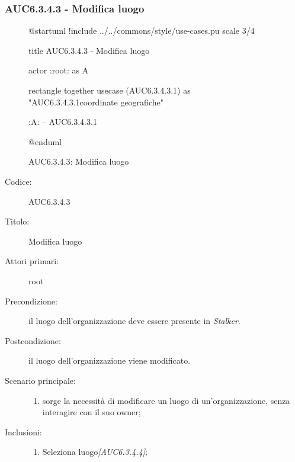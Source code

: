 \documentclass[casi-duso]{subfiles}
\begin{document}
\subsubsection{AUC6.3.4.3 - Modifica luogo}%
\label{subsub:AUC6.3.4.3}

\begin{figure}[h!] 
  \centering 
  \begin{plantuml}
  @startuml 
  !include ../../commons/style/use-cases.pu
  scale 3/4

  title AUC6.3.4.3 - Modifica luogo

  actor :root: as A

  rectangle {
    together {
      usecase (AUC6.3.4.3.1) as "AUC6.3.4.3.1\nModifica coordinate geografiche"
    }
  }

  :A: -- AUC6.3.4.3.1

  @enduml
  \end{plantuml} 
  \caption{AUC6.3.4.3: Modifica luogo} 
  \label{fig:auc6_3_4_3} 
\end{figure}

\begin{description}
  \item[Codice:] AUC6.3.4.3
  \item[Titolo:] Modifica luogo
  \item[Attori primari:] root
  \item[Precondizione:] il luogo dell'organizzazione deve essere presente in \emph{Stalker}.
  \item[Postcondizione:] il luogo dell'organizzazione viene modificato.
  \item[Scenario principale:]
  \begin{enumerate}
    \item sorge la necessità di modificare un luogo di un'organizzazione, senza interagire con il suo owner;
  \end{enumerate}
  \item[Inclusioni:]
  \begin{enumerate}
    \item Seleziona luogo\emph{[AUC6.3.4.4]};
  \end{enumerate}
\end{description}
\end{document}
